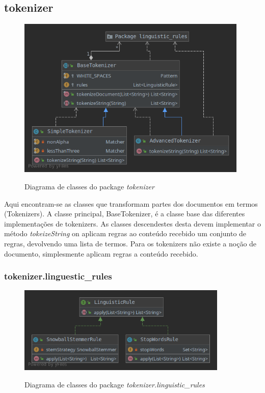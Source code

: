 \documentclass[12pt]{article}
\begin{document}
\subsection{tokenizer}
\begin{figure}[h]
  \center
  \includegraphics[width=11cm]{packages_tokenizer.png}
  \label{fig:packages_tokenizer}
  \caption{Diagrama de classes do package \it tokenizer}
\end{figure}

Aqui encontram-se as classes que transformam partes dos documentos em termos (Tokenizers). 
A classe principal, BaseTokenizer, é a classe base das diferentes implementações
de tokenizers. As classes descendestes desta devem implementar o método {\it tokeizeString}
on aplicam regras ao conteúdo recebido um conjunto de regras, devolvendo uma lista de termos.
Para os tokenizers não existe a noção de documento, simplesmente aplicam regras a
conteúdo recebido.

\subsubsection{tokenizer.linguestic\_rules}
\begin{figure}[h]
  \center
  \includegraphics[width=10cm]{packages_tokenizer_linguistic_rules.png}
  \label{fig:packages_indexer}
  \caption{Diagrama de classes do package \it tokenizer.linguistic\_rules}
\end{figure}
\end{document}
